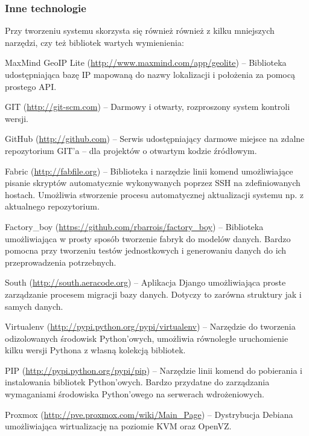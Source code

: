 \begin{minipage}{\textwidth}
    \subsubsection{Inne technologie}
    Przy tworzeniu systemu skorzysta się również również z kilku mniejszych narzędzi, czy też bibliotek wartych wymienienia:
    \begin{packed_item}
        \item{MaxMind GeoIP Lite (\url{http://www.maxmind.com/app/geolite}) -- Biblioteka udostępniająca bazę IP mapowaną do nazwy lokalizacji i położenia za pomocą prostego API.}
        \item{GIT (\url{http://git-scm.com}) -- Darmowy i otwarty, rozproszony system kontroli wersji.}
        \item{GitHub (\url{http://github.com}) -- Serwis udostępniający darmowe miejsce na zdalne repozytorium GIT'a -- dla projektów o otwartym kodzie źródłowym.}
        \item{Fabric (\url{http://fabfile.org}) -- Biblioteka i narzędzie linii komend umożliwiające pisanie skryptów automatycznie wykonywanych poprzez SSH na zdefiniowanych hostach. Umożliwia stworzenie procesu automatycznej aktualizacji systemu np. z aktualnego repozytorium.}
        \item{Factory\_boy (\url{https://github.com/rbarrois/factory\_boy}) -- Biblioteka umożliwiająca w prosty sposób tworzenie fabryk do modelów danych. Bardzo pomocna przy tworzeniu testów jednostkowych i generowaniu danych do ich przeprowadzenia potrzebnych.}
        \item{South (\url{http://south.aeracode.org}) -- Aplikacja Django umożliwiająca proste zarządzanie procesem migracji bazy danych. Dotyczy to zarówna struktury jak i samych danych.}
        \item{Virtualenv (\url{http://pypi.python.org/pypi/virtualenv}) -- Narzędzie do tworzenia odizolowanych środowisk Python'owych, umożliwia równoległe uruchomienie kilku wersji Pythona z własną kolekcją bibliotek.}
        \item{PIP (\url{http://pypi.python.org/pypi/pip}) -- Narzędzie linii komend do pobierania i instalowania bibliotek Python'owych. Bardzo przydatne do zarządzania wymaganiami środowiska Python'owego na serwerach wdrożeniowych.}
        \item{Proxmox (\url{http://pve.proxmox.com/wiki/Main_Page}) -- Dystrybucja Debiana umożliwiająca wirtualizację na poziomie KVM oraz OpenVZ.}

\end{packed_item}
\end{minipage}
